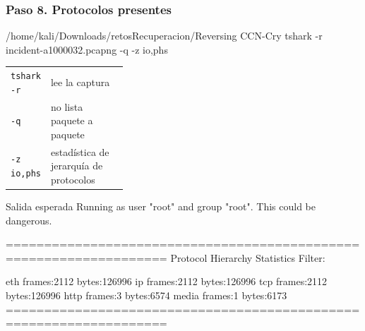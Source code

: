 \documentclass[11pt,a4paper]{article}
\begin{document}
\subsubsection*{Paso 8. Protocolos presentes}
\begin{comando}{/home/kali/Downloads/retosRecuperacion/Reversing CCN-Cry}
tshark -r incident-a1000032.pcapng -q -z io,phs
\end{comando}
\begin{tcolorbox}[enhanced, breakable, colback=white, colframe=gray!40, boxrule=0.3pt, arc=1pt, left=4pt, right=4pt, top=2pt, bottom=2pt, fonttitle=\sffamily\scriptsize\bfseries, coltitle=black!75, colbacktitle=gray!8, title={Qué hace cada parte}, attach title to upper, before skip=2pt, after skip=4pt, fontupper=\small]
\par{\renewcommand{\arraystretch}{1.12}\begin{tabularx}{\linewidth}{@{}>{\raggedright\arraybackslash}p{0.33\linewidth}>{\raggedright\arraybackslash}X@{}}
\texttt{tshark -r} & lee la captura \\
\texttt{-q} & no lista paquete a paquete \\
\texttt{-z io,\allowbreak{}phs} & estadística de jerarquía de protocolos \\
\end{tabularx}}
\end{tcolorbox}
\begin{salidan}{Salida esperada}
Running as user "root" and group "root". This could be dangerous.

===================================================================
Protocol Hierarchy Statistics
Filter: 

eth                                      frames:2112 bytes:126996
  ip                                     frames:2112 bytes:126996
    tcp                                  frames:2112 bytes:126996
      http                               frames:3 bytes:6574
        media                            frames:1 bytes:6173
===================================================================
\end{salidan}
\end{document}

